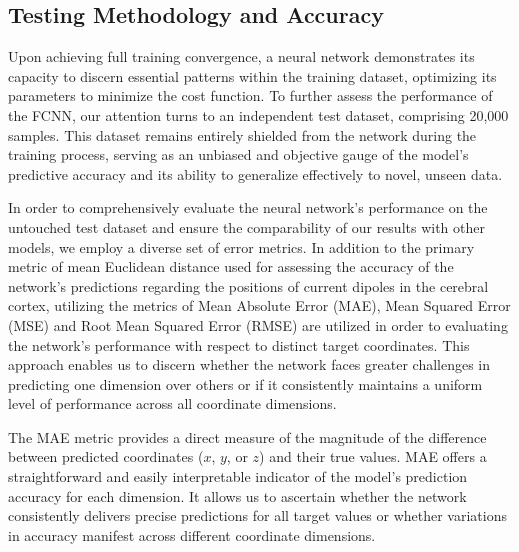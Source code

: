 \documentclass[a4paper, UKenglish, 11pt]{uiomaster}
\begin{document}
\subsection{Testing Methodology and Accuracy}
Upon achieving full training convergence, a neural network demonstrates its capacity to discern essential patterns within the training dataset, optimizing its parameters to minimize the cost function. To further assess the performance of the FCNN, our attention turns to an independent test dataset, comprising 20,000 samples. This dataset remains entirely shielded from the network during the training process, serving as an unbiased and objective gauge of the model's predictive accuracy and its ability to generalize effectively to novel, unseen data.

In order to comprehensively evaluate the neural network's performance on the untouched test dataset and ensure the comparability of our results with other models, we employ a diverse set of error metrics. In addition to the primary metric of mean Euclidean distance used for assessing the accuracy of the network's predictions regarding the positions of current dipoles in the cerebral cortex, utilizing the metrics of Mean Absolute Error (MAE), Mean Squared Error (MSE) and Root Mean Squared Error (RMSE) are utilized in order to evaluating the network's performance with respect to distinct target coordinates. This approach enables us to discern whether the network faces greater challenges in predicting one dimension over others or if it consistently maintains a uniform level of performance across all coordinate dimensions.

The MAE metric provides a direct measure of the magnitude of the difference between predicted coordinates ($x$, $y$, or $z$) and their true values. MAE offers a straightforward and easily interpretable indicator of the model's prediction accuracy for each dimension. It allows us to ascertain whether the network consistently delivers precise predictions for all target values or whether variations in accuracy manifest across different coordinate dimensions.
\end{document}
